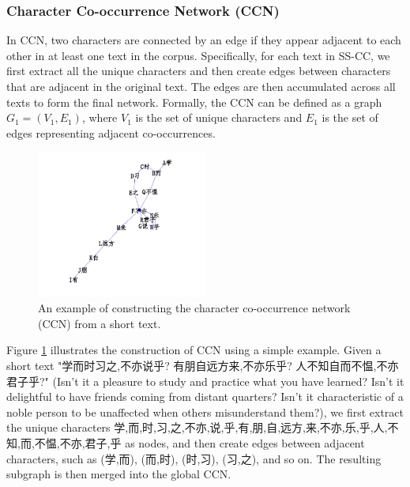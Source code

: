 \documentclass[11pt]{article}
\begin{document}
\subsubsection{Character Co-occurrence Network (CCN)}
In CCN, two characters are connected by an edge if they appear adjacent to each other in at least one text in the corpus. Specifically, for each text in SS-CC, we first extract all the unique characters and then create edges between characters that are adjacent in the original text. The edges are then accumulated across all texts to form the final network. Formally, the CCN can be defined as a graph $G_1=(V_1,E_1)$, where $V_1$ is the set of unique characters and $E_1$ is the set of edges representing adjacent co-occurrences.
\begin{figure}[htbp]
    \centering
    \includegraphics[width=0.5\textwidth]{../example/ccn_example.png}
    \caption{An example of constructing the character co-occurrence network (CCN) from a short text.}
    \label{fig:ccn_example}
    \end{figure}
Figure \ref{fig:ccn_example} illustrates the construction of CCN using a simple example. Given a short text "学而时习之,不亦说乎? 有朋自远方来,不亦乐乎? 人不知自而不愠,不亦君子乎?" (Isn't it a pleasure to study and practice what you have learned? Isn't it delightful to have friends coming from distant quarters? Isn't it characteristic of a noble person to be unaffected when others misunderstand them?), we first extract the unique characters {学,而,时,习,之,不亦,说,乎,有,朋,自,远方,来,不亦,乐,乎,人,不知,而,不愠,不亦,君子,乎} as nodes, and then create edges between adjacent characters, such as (学,而), (而,时), (时,习), (习,之), and so on. The resulting subgraph is then merged into the global CCN.
\end{document}

